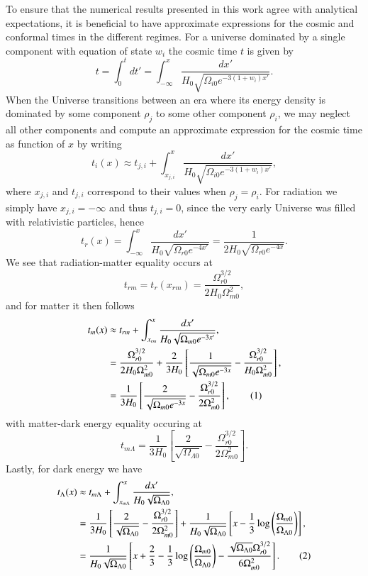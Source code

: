 \documentclass{aa}
\newcommand\numberthis{\addtocounter{equation}{1}\tag{\theequation}}
\begin{document}
To ensure that the numerical results presented in this work agree with analytical expectations, it is beneficial to have approximate expressions for the cosmic and conformal times in the different regimes. For a universe dominated by a single component with equation of state $w_i$ the cosmic time $t$ is given by
\begin{equation}
  t = \int_0^t dt' = \int_{-\infty}^{x}\frac{dx'}{H_0\sqrt{\Omega_{i0}e^{-3(1+w_i)x'}}}.
\end{equation}
When the Universe transitions between an era where its energy density is dominated by some component $\rho_j$ to some other component $\rho_i$, we may neglect all other components and compute an approximate expression for the cosmic time as function of $x$ by writing
\begin{equation}
  t_i(x) \approx t_{j,i} + \int_{x_{j,i}}^{x}\frac{dx'}{H_0\sqrt{\Omega_{i0}e^{-3(1+w_i)x'}}},
\end{equation}
where $x_{j,i}$ and $t_{j,i}$ correspond to their values when $\rho_j=\rho_i$. For radiation we simply have $x_{j,i}=-\infty$ and thus $t_{j,i}=0$, since the very early Universe was filled with relativistic particles, hence
\begin{equation}
  t_r(x) = \int_{{-\infty}}^{x}\frac{dx'}{H_0\sqrt{\Omega_{r0}e^{-4x'}}} = \frac{1}{2H_0\sqrt{\Omega_{r0}e^{-4x}}}.
\end{equation}
We see that radiation-matter equality occurs at
\begin{equation}
  t_{rm} = t_r(x_{rm}) = \frac{\Omega_{r0}^{3/2}}{2H_0\Omega_{m0}^2},
\end{equation}
and for matter it then follows
\begin{align*}
  t_m(x) &\approx t_{rm} + \int_{x_{rm}}^{x}\frac{dx'}{H_0\sqrt{\Omega_{m0}e^{-3x'}}}, 
  \\
  &= \frac{\Omega_{r0}^{3/2}}{2H_0\Omega_{m0}^2}+\frac{2}{3H_0}\left[\frac{1}{\sqrt{\Omega_{m0}e^{-3x}}} - \frac{\Omega_{r0}^{3/2}}{H_0\Omega_{m0}^2} \right],
  \\
  &= \frac{1}{3H_0}\left[\frac{2}{\sqrt{\Omega_{m0}e^{-3x}}} - \frac{\Omega_{r0}^{3/2}}{2\Omega^2_{m0}} \right], \numberthis
\end{align*}
with matter-dark energy equality occuring at
\begin{equation}
  t_{m\Lambda} = \frac{1}{3H_0}\left[\frac{2}{\sqrt{\Omega_{\Lambda0}}} - \frac{\Omega_{r0}^{3/2}}{2\Omega^2_{m0}} \right].
\end{equation}
Lastly, for dark energy we have
\begin{align*}
  t_\Lambda(x) &\approx t_{m\Lambda} + \int_{x_{m\Lambda}}^{x}\frac{dx'}{H_0\sqrt{\Omega_{\Lambda0}}}, 
  \\
  &= \frac{1}{3H_0}\left[\frac{2}{\sqrt{\Omega_{\Lambda0}}} - \frac{\Omega_{r0}^{3/2}}{2\Omega^2_{m0}} \right] + \frac{1}{H_0\sqrt{\Omega_{\Lambda0}}}\left[x - \frac{1}{3}\log\left(\frac{\Omega_{m0}}{\Omega_{\Lambda0}}\right)\right],
  \\
  &= \frac{1}{H_0\sqrt{\Omega_{\Lambda0}}}\left[x+\frac{2}{3}-\frac{1}{3}\log\left(\frac{\Omega_{m0}}{\Omega_{\Lambda0}}\right)-\frac{\sqrt{\Omega_{\Lambda0}}\Omega_{r0}^{3/2}}{6\Omega^2_{m0}}\right]. \numberthis
\end{align*}
\end{document}
